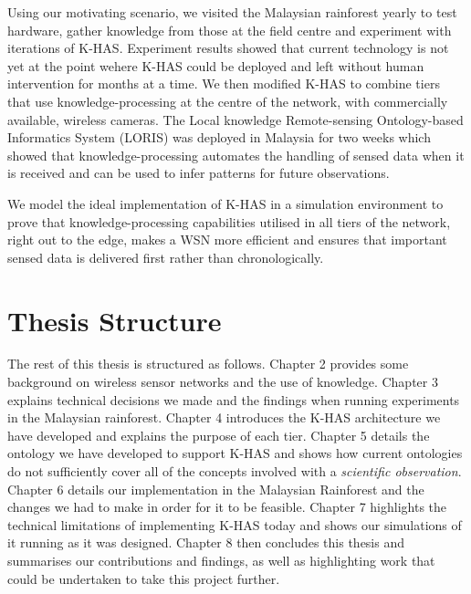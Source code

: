Using our motivating scenario, we visited the Malaysian rainforest yearly to test hardware, gather knowledge from those at the field centre and experiment with iterations of K-HAS. Experiment results showed that current technology is not yet at the point wehere K-HAS could be deployed and left without human intervention for months at a time. We then modified K-HAS to combine tiers that use knowledge-processing at the centre of the network, with commercially available, wireless cameras. The Local knowledge Remote-sensing Ontology-based Informatics System (LORIS) was deployed in Malaysia for two weeks which showed that knowledge-processing automates the handling of sensed data when it is received and can be used to infer patterns for future observations.

We model the ideal implementation of K-HAS in a simulation environment to prove that knowledge-processing capabilities utilised in all tiers of the network, right out to the edge, makes a WSN more efficient and ensures that important sensed data is delivered first rather than chronologically.


\section{Thesis Structure}
The rest of this thesis is structured as follows. Chapter 2 provides some background on wireless sensor networks and the use of knowledge. Chapter 3 explains technical decisions we made and the findings when running experiments in the Malaysian rainforest. Chapter 4 introduces the K-HAS architecture we have developed and explains the purpose of each tier. Chapter 5 details the ontology we have developed to support K-HAS and shows how current ontologies do not sufficiently cover all of the concepts involved with a \textit{scientific observation}. Chapter 6 details our implementation in the Malaysian Rainforest and the changes we had to make in order for it to be feasible. Chapter 7 highlights the technical limitations of implementing K-HAS today and shows our simulations of it running as it was designed. Chapter 8 then concludes this thesis and summarises our contributions and findings, as well as highlighting work that could be undertaken to take this project further.